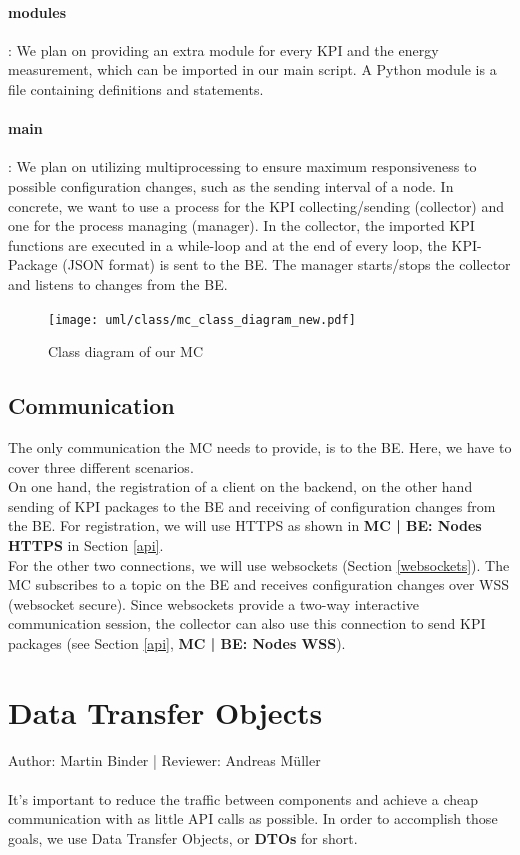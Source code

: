 \documentclass{scrreprt}
\begin{document}
\paragraph{modules}: We plan on providing an extra module for every KPI and the energy measurement, which can be imported in our main script. A Python module is a file containing definitions and statements. 
\paragraph{main}: We plan on utilizing multiprocessing to ensure maximum responsiveness to possible configuration changes, such as the sending interval of a node. In concrete, we want to use a process for the KPI collecting/sending (collector) and one for the process managing (manager). In the collector, the imported KPI functions are executed in a while-loop and at the end of every loop, the KPI-Package (JSON format) is sent to the BE. The manager starts/stops the collector and listens to changes from the BE.
\begin{figure}[H]
	\centering
	\texttt{[image: uml/class/mc\_class\_diagram\_new.pdf]}
	\caption{Class diagram of our MC}
	\label{class_mc}
\end{figure}
\subsection{Communication}
The only communication the MC needs to provide, is to the BE.
Here, we have to cover three different scenarios. \\
On one hand, the registration of a client on the backend, on the other hand sending of KPI packages to the BE and receiving of configuration changes from the BE.
For registration, we will use HTTPS as shown in \textbf{MC | BE: Nodes HTTPS} in Section \ref{api}. \\
For the other two connections, we will use websockets (Section \ref{websockets}). The MC subscribes to a topic on the BE and receives configuration changes over WSS (websocket secure). Since websockets provide a two-way interactive communication session, the collector can also use this connection to send KPI packages (see Section \ref{api}, \textbf{MC | BE: Nodes WSS}).
\section{Data Transfer Objects}
Author: Martin Binder | Reviewer: Andreas M\"uller\\ \\
It's important to reduce the traffic between components and achieve a cheap communication with as little API calls as possible. In order to accomplish those goals, we use Data Transfer Objects, or \textbf{DTOs} for short.
\end{document}
